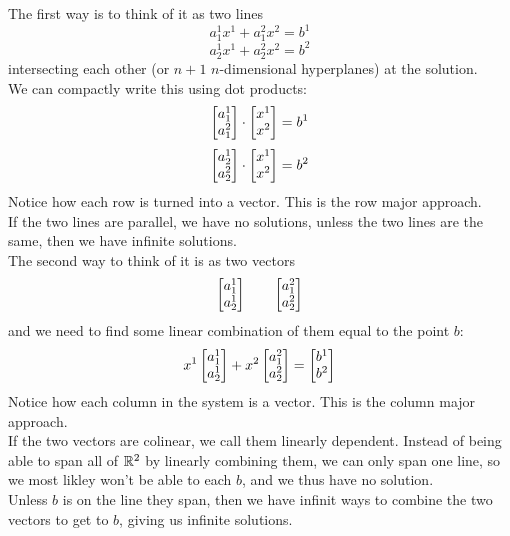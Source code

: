 \documentclass[12pt]{article}
\begin{document}
    The first way is to think of it as two lines
    \[ a_1^1x^1 + a_1^2x^2 = b^1 \]
    \[ a_2^1x^1 + a_2^2x^2 = b^2 \]
    intersecting each other (or $n+1$ $n$-dimensional hyperplanes)
    at the solution. \\
    We can compactly write this using dot products:
    \[ \begin{bmatrix} {a_1^1}\\{a_1^2} \end{bmatrix} \cdot \begin{bmatrix} {x^1}\\{x^2} \end{bmatrix}
    = b^1 \]
    \[ \begin{bmatrix} {a_2^1}\\{a_2^2} \end{bmatrix} \cdot \begin{bmatrix} {x^1}\\{x^2} \end{bmatrix}
    = b^2 \]
    Notice how each row is turned into a vector.
    This is the row major approach. \\
    If the two lines are parallel, we have no solutions,
    unless the two lines are the same, then we have
    infinite solutions. \\

    The second way to think of it is as two vectors
    \[ \begin{bmatrix} {a_1^1}\\{a_2^1} \end{bmatrix} \qquad \begin{bmatrix} {a_1^2}\\{a_2^2} \end{bmatrix} \]
    and we need to find some linear combination of them
    equal to the point $b$: 
    \[ x^1\begin{bmatrix} {a_1^1}\\{a_2^1} \end{bmatrix} + x^2\begin{bmatrix} {a_1^2}\\{a_2^2} \end{bmatrix}
    = \begin{bmatrix} {b^1}\\{b^2} \end{bmatrix} \]
    Notice how each column in the system is a vector.
    This is the column major approach. \\
    If the two vectors are colinear,
    we call them linearly dependent.
    Instead of being able to span all of $\mathbb{R}^2$
    by linearly combining them, we can only span one line,
    so we most likley won't be able to each $b$,
    and we thus have no solution. \\
    Unless $b$ is on the line they span,
    then we have infinit ways to combine the two vectors
    to get to $b$, giving us infinite solutions. \\
\end{document}
